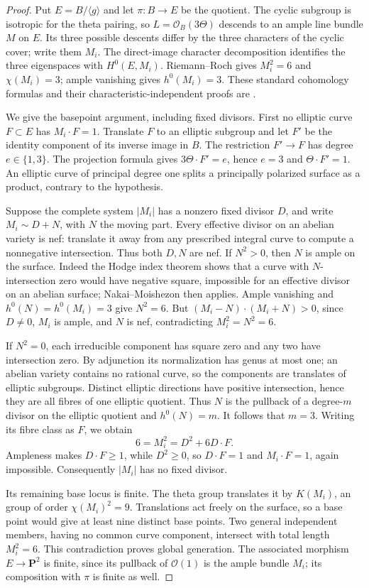 \begin{proof}
Put $E=B/\langle g\rangle$ and let $\pi:B\to E$ be the quotient.
The cyclic subgroup is isotropic for the theta pairing, so
$L=\mathcal O_B(3\Theta)$ descends to an ample line bundle $M$
on $E$. Its three possible descents differ by the three characters
of the cyclic cover; write them $M_i$. The direct-image character
decomposition identifies the three eigenspaces with $H^0(E,M_i)$.
Riemann--Roch gives $M_i^2=6$ and $\chi(M_i)=3$; ample vanishing
gives $h^0(M_i)=3$. These standard cohomology formulas and their
characteristic-independent proofs are
\citet[Theorems~9.11 and~9.14, Proposition~9.18]{EdixhovenVanDerGeerMoonenAV}.

We give the basepoint argument, including fixed divisors. First no
elliptic curve $F\subset E$ has $M_i\cdot F=1$. Translate $F$ to
an elliptic subgroup and let $F'$ be the identity component of its
inverse image in $B$. The restriction $F'\to F$ has degree
$e\in\{1,3\}$. The projection formula gives
$3\Theta\cdot F'=e$, hence $e=3$ and $\Theta\cdot F'=1$.
An elliptic curve of principal degree one splits a principally
polarized surface as a product, contrary to the hypothesis.

Suppose the complete system $|M_i|$ has a nonzero fixed divisor
$D$, and write $M_i\sim D+N$, with $N$ the moving part.
Every effective divisor on an abelian variety is nef: translate
it away from any prescribed integral curve to compute a
nonnegative intersection. Thus both $D,N$ are nef.
If $N^2>0$, then $N$ is ample on the surface. Indeed the Hodge
index theorem shows that a curve with $N$-intersection zero
would have negative square, impossible for an effective divisor
on an abelian surface; Nakai--Moishezon then applies.
Ample vanishing and $h^0(N)=h^0(M_i)=3$ give $N^2=6$.
But $(M_i-N)\cdot(M_i+N)>0$, since $D\ne0$, $M_i$ is ample,
and $N$ is nef, contradicting $M_i^2=N^2=6$.

If $N^2=0$, each irreducible component has square zero and any
two have intersection zero. By adjunction its normalization has
genus at most one; an abelian variety contains no rational curve,
so the components are translates of elliptic subgroups. Distinct
elliptic directions have positive intersection, hence they are
all fibres of one elliptic quotient. Thus $N$ is the pullback of
a degree-$m$ divisor on the elliptic quotient and $h^0(N)=m$.
It follows that $m=3$. Writing its fibre class as $F$, we obtain
\[
              6=M_i^2=D^2+6D\cdot F.
\]
Ampleness makes $D\cdot F\ge1$, while $D^2\ge0$, so
$D\cdot F=1$ and $M_i\cdot F=1$, again impossible.
Consequently $|M_i|$ has no fixed divisor.

Its remaining base locus is finite. The theta group translates
it by $K(M_i)$, an \etale group of order $\chi(M_i)^2=9$.
Translations act freely on the surface, so a base point would
give at least nine distinct base points. Two general independent
members, having no common curve component, intersect with total
length $M_i^2=6$. This contradiction proves global generation.
The associated morphism $E\to\mathbf P^2$ is finite, since its
pullback of $\mathcal O(1)$ is the ample bundle $M_i$; its
composition with $\pi$ is finite as well.
\end{proof}

